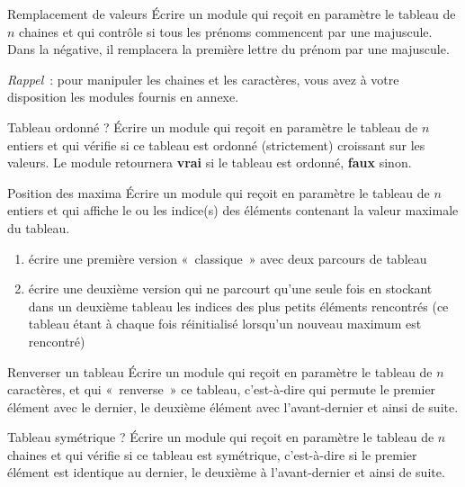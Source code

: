 \begin{Exercice}{Remplacement de valeurs}
	Écrire un module qui reçoit en paramètre le tableau
	 de $n$ chaines et qui
	contrôle si tous les prénoms commencent par une majuscule.
	Dans la négative, il remplacera la première lettre du prénom 
	par une majuscule.
	
	\textit{Rappel}~: pour manipuler les chaines et les caractères,
	vous avez à votre disposition les modules fournis en annexe.
\end{Exercice}

\begin{Exercice}{Tableau ordonné ?}
	Écrire un module qui reçoit en paramètre le tableau
	 de $n$ entiers et qui
	vérifie si ce tableau est ordonné (strictement) croissant sur les
	valeurs. Le module retournera \textbf{vrai} si le tableau est ordonné,
	\textbf{faux} sinon.
\end{Exercice}

\begin{Exercice}{Position des maxima}
	Écrire un module qui reçoit en paramètre le tableau
	 de $n$ entiers et qui
	affiche le ou les indice(s) des éléments contenant la valeur maximale
	du tableau.

	\begin{enumerate}[label=\alph*)]
	\item 
		écrire une première version «~classique~» avec deux parcours de tableau
	\item
		écrire une deuxième version qui ne parcourt qu’une seule fois 
		 en
		stockant dans un deuxième tableau les indices des plus petits éléments
		rencontrés (ce tableau étant à chaque fois réinitialisé lorsqu’un
		nouveau maximum est rencontré)
	\end{enumerate}
\end{Exercice}

\begin{Exercice}{Renverser un tableau}
	Écrire un module qui reçoit en paramètre le tableau
	 de $n$ caractères, et qui
	«~renverse~» ce tableau, c’est-à-dire qui permute le premier élément
	avec le dernier, le deuxième élément avec l’avant-dernier et ainsi de
	suite.
\end{Exercice}

\begin{Exercice}{Tableau symétrique ?}
	Écrire un module qui reçoit en paramètre le tableau
	 de $n$ chaines et qui
	vérifie si ce tableau est symétrique, c’est-à-dire si le premier
	élément est identique au dernier, le deuxième à l’avant-dernier et
	ainsi de suite.
\end{Exercice}

